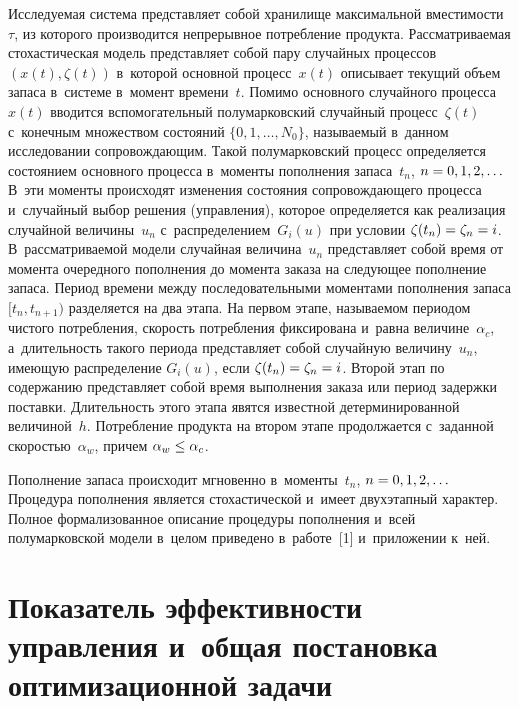 \begin{multicols}{2}
Исследуемая сис\-те\-ма пред\-став\-ля\-ет собой хранилище максимальной 
вмес\-ти\-мости~$\tau$, из которого производится непрерывное по\-треб\-ле\-ние продукта. 
Рас\-смат\-ри\-ва\-емая стохастическая модель пред\-став\-ля\-ет собой пару случайных 
процессов $(x(t), \zeta(t))$ в~которой основ\-ной процесс~$x(t)$ описывает 
текущий объем запаса в~сис\-те\-ме в~момент времени~$t$. Помимо основного 
случайного процесса~$x(t)$ вводится вспомогательный полумарковский 
случайный процесс~$\zeta(t)$ с~конечным множеством со\-сто\-яний $\{0,1,\ldots, 
N_0\}$, на\-зы\-ва\-емый в~данном исследовании со\-про\-вож\-да\-ющим. 
Такой полумарковский процесс определяется со\-сто\-яни\-ем 
основного процесса в~моменты пополнения запаса~$t_n$, $n\hm=0,1,2,\ldots$
  В~эти моменты происходят изменения со\-сто\-яния со\-провождающе\-го 
процесса и~случайный выбор реше\-ния (управ\-ле\-ния), которое определяется как 
реализация случайной величины~$u_n$ с~распределением~$G_i(u)$ при 
условии $\zeta(t_n)\hm=\zeta_n\hm= i$. В~рас\-смат\-ри\-ва\-емой модели случайная 
величина~$u_n$ пред\-став\-ля\-ет собой время от момента очередного пополнения 
до момента заказа на следующее пополнение запаса. Период времени между 
последовательными моментами пополнения запаса $[t_n, t_{n+1})$ разделяется 
на два этапа. На первом этапе, называемом периодом чис\-то\-го по\-треб\-ле\-ния, 
скорость потребления фиксирована и~рав\-на величине~$\alpha_c$, 
а~дли\-тель\-ность такого периода пред\-став\-ля\-ет собой случайную 
величину~$u_n$, име\-ющую распределение $G_i(u)$, если 
$\zeta(t_n)\hm=\zeta_n\hm=i$. Второй этап по содержанию пред\-став\-ля\-ет собой 
время выполнения заказа или период за\-держ\-ки по\-став\-ки. Дли\-тель\-ность этого 
этапа явятся известной детерминированной величиной~$h$. По\-треб\-ле\-ние 
продукта на втором этапе продолжается с~заданной ско\-ростью~$\alpha_w$, 
причем $\alpha_w\hm\leq \alpha_c$.
  
  Пополнение запаса происходит мгновенно в~моменты~$t_n$, 
$n\hm=0,1,2,\ldots$ Процедура пополнения является стохастической и~имеет 
двух\-этап\-ный характер. Полное формализованное описание процедуры 
пополнения и~всей полумарковской модели в~целом приведено в~работе~[1] 
и~приложении к~ней.
  
\section{Показатель эффективности управления и~общая постановка 
оптимизационной задачи}


\end{multicols}
